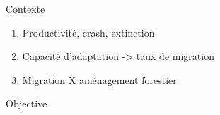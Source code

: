 \documentclass[11pt, compress, aspectratio=1610]{beamer}
\providecommand{\tightlist}{%
  \setlength{\itemsep}{0pt}\setlength{\parskip}{0pt}}
\begin{document}
\begin{frame}{Contexte}

\begin{enumerate}
\def\labelenumi{\arabic{enumi}.}
\tightlist
\item
  Productivité, crash, extinction
\item
  Capacité d'adaptation -\textgreater{} taux de migration
\item
  Migration X aménagement forestier
\end{enumerate}

\end{frame}

\begin{frame}{Objective}

\begin{center}
\end{center}
\end{frame}
\end{document}
